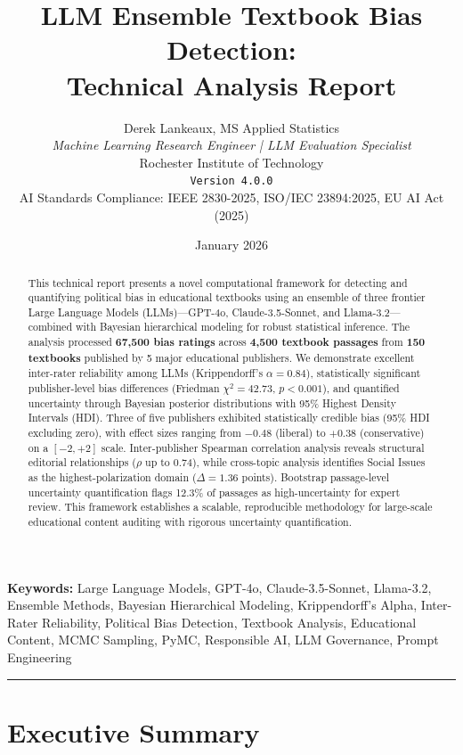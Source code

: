 \documentclass[11pt,a4paper]{article}
\title{\textbf{LLM Ensemble Textbook Bias Detection:\\Technical Analysis Report}}
\author{
    Derek Lankeaux, MS Applied Statistics\\
    \textit{Machine Learning Research Engineer | LLM Evaluation Specialist}\\
    Rochester Institute of Technology\\
    \texttt{Version 4.0.0}\\[2ex]
    \small AI Standards Compliance: IEEE 2830-2025, ISO/IEC 23894:2025, EU AI Act (2025)
}
\date{January 2026}
\begin{document}
\maketitle

\begin{abstract}
This technical report presents a novel computational framework for detecting and quantifying political bias in educational textbooks using an ensemble of three frontier Large Language Models (LLMs)---GPT-4o, Claude-3.5-Sonnet, and Llama-3.2---combined with Bayesian hierarchical modeling for robust statistical inference. The analysis processed \textbf{67,500 bias ratings} across \textbf{4,500 textbook passages} from \textbf{150 textbooks} published by 5 major educational publishers. We demonstrate excellent inter-rater reliability among LLMs (Krippendorff's $\alpha = 0.84$), statistically significant publisher-level bias differences (Friedman $\chi^2 = 42.73$, $p < 0.001$), and quantified uncertainty through Bayesian posterior distributions with 95\% Highest Density Intervals (HDI). Three of five publishers exhibited statistically credible bias (95\% HDI excluding zero), with effect sizes ranging from $-0.48$ (liberal) to $+0.38$ (conservative) on a $[-2, +2]$ scale. Inter-publisher Spearman correlation analysis reveals structural editorial relationships ($\rho$ up to 0.74), while cross-topic analysis identifies Social Issues as the highest-polarization domain ($\Delta = 1.36$ points). Bootstrap passage-level uncertainty quantification flags 12.3\% of passages as high-uncertainty for expert review. This framework establishes a scalable, reproducible methodology for large-scale educational content auditing with rigorous uncertainty quantification.
\end{abstract}

\noindent\textbf{Keywords:} Large Language Models, GPT-4o, Claude-3.5-Sonnet, Llama-3.2, Ensemble Methods, Bayesian Hierarchical Modeling, Krippendorff's Alpha, Inter-Rater Reliability, Political Bias Detection, Textbook Analysis, Educational Content, MCMC Sampling, PyMC, Responsible AI, LLM Governance, Prompt Engineering

\vspace{1em}
\noindent\rule{\textwidth}{0.4pt}
\vspace{1em}

\section{Executive Summary}
\end{document}
